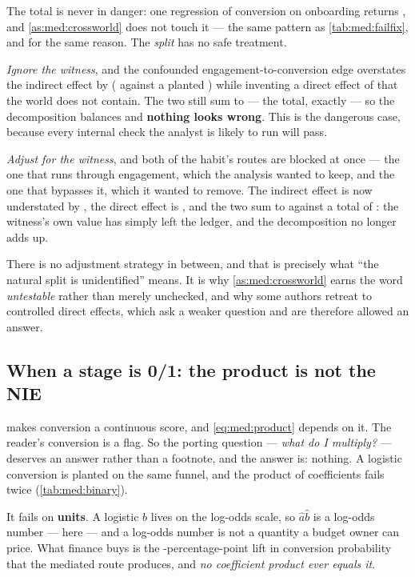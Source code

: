The total is never in danger: one regression of conversion on onboarding returns \nbFourRwTotal, and
\cref{as:med:crossworld} does not touch it --- the same pattern as \cref{tab:med:failfix}, and for
the same reason. The \emph{split} has no safe treatment.

\emph{Ignore the witness}, and the confounded engagement-to-conversion edge overstates the indirect
effect by \nbFourRwBiasIgnored{} (\nbFourRwNieIgnored{} against a planted \nbFourRwPlantedViaM) while
inventing a direct effect of \nbFourRwDirIgnored{} that the world does not contain. The two still sum
to \nbFourRwSumIgnored{} --- the total, exactly --- so the decomposition balances and
\textbf{nothing looks wrong}. This is the dangerous case, because every internal check the analyst is
likely to run will pass.

\emph{Adjust for the witness}, and both of the habit's routes are blocked at once --- the one that
runs through engagement, which the analysis wanted to keep, and the one that bypasses it, which it
wanted to remove. The indirect effect is now understated by \nbFourRwBiasAdjusted, the direct effect
is \nbFourRwDirAdjusted, and the two sum to \nbFourRwSumAdjusted{} against a total of \nbFourRwTotal:
the witness's own value has simply left the ledger, and the decomposition no longer adds up.

There is no adjustment strategy in between, and that is precisely what ``the natural split is
unidentified'' means. It is why \cref{as:med:crossworld} earns the word \emph{untestable} rather than
merely unchecked, and why some authors retreat to controlled direct effects, which ask a weaker
question and are therefore allowed an answer.

\subsection*{When a stage is 0/1: the product is not the NIE}

 makes conversion a continuous score, and \cref{eq:med:product} depends on it. The
reader's conversion is a flag. So the porting question --- \emph{what do I multiply?} --- deserves an
answer rather than a footnote, and the answer is: nothing. A logistic conversion is planted on the
same funnel, and the product of coefficients fails twice (\cref{tab:med:binary}).

It fails on \textbf{units}. A logistic $b$ lives on the log-odds scale, so $\hat a \hat b$ is a
log-odds number --- \nbFourBinAbLogodds{} here --- and a log-odds number is not a quantity a budget
owner can price. What finance buys is the \nbFourBinNiePp-percentage-point lift in conversion
probability that the mediated route produces, and \emph{no coefficient product ever equals it}.

